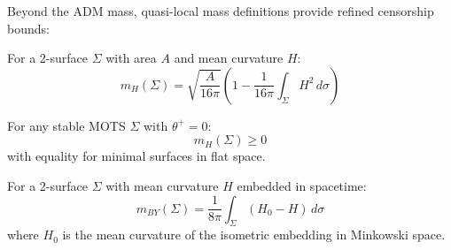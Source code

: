 Beyond the ADM mass, quasi-local mass definitions provide refined censorship bounds:

\begin{definition}
For a 2-surface $\Sigma$ with area $A$ and mean curvature $H$:
\begin{equation}
m_H(\Sigma) = \sqrt{\frac{A}{16\pi}}\left(1 - \frac{1}{16\pi}\int_\Sigma H^2 \, d\sigma\right)
\end{equation}
\end{definition}

\begin{conjecture}
For any stable MOTS $\Sigma$ with $\theta^+ = 0$:
\begin{equation}
m_H(\Sigma) \geq 0
\end{equation}
with equality for minimal surfaces in flat space.
\end{conjecture}

\begin{definition}
For a 2-surface $\Sigma$ with mean curvature $H$ embedded in spacetime:
\begin{equation}
m_{BY}(\Sigma) = \frac{1}{8\pi}\int_\Sigma (H_0 - H) \, d\sigma
\end{equation}
where $H_0$ is the mean curvature of the isometric embedding in Minkowski space.
\end{definition}

